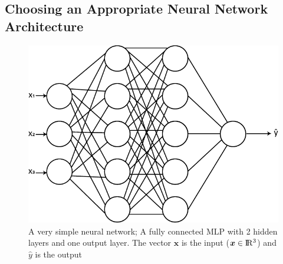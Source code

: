 \subsection{Choosing an Appropriate Neural Network Architecture}

\begin{figure}[H]
	\centering
	\includegraphics[scale=0.75]{graphics/mlp.pdf}
	\caption{A very simple neural network; A fully connected MLP with 2 hidden layers and one output layer. The vector $\boldsymbol{x}$ is the input ($\boldsymbol{x} \in \rm I\!R^{3}$) and $\hat{y}$ is the output}
	\label{fig:mlp}	
\end{figure}

